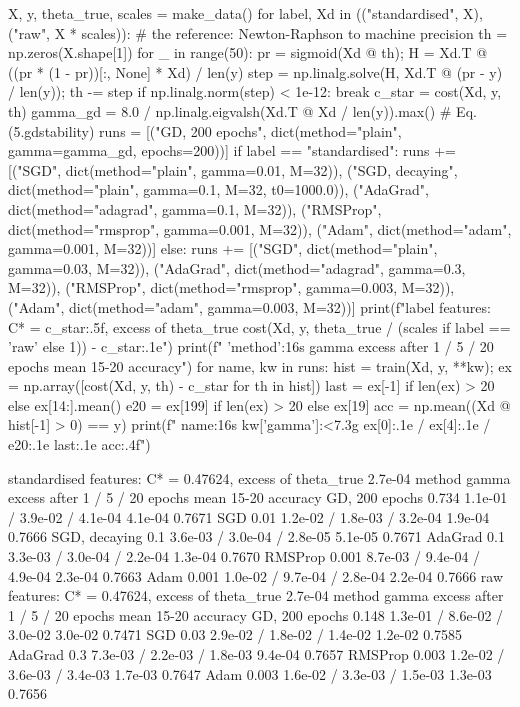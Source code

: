 \begin{Python}{}
X, y, theta_true, scales = make_data()
for label, Xd in (("standardised", X), ("raw", X * scales)):
    # the reference: Newton-Raphson to machine precision
    th = np.zeros(X.shape[1])
    for _ in range(50):
        pr = sigmoid(Xd @ th); H = Xd.T @ ((pr * (1 - pr))[:, None] * Xd) / len(y)
        step = np.linalg.solve(H, Xd.T @ (pr - y) / len(y)); th -= step
        if np.linalg.norm(step) < 1e-12: break
    c_star = cost(Xd, y, th)
    gamma_gd = 8.0 / np.linalg.eigvalsh(Xd.T @ Xd / len(y)).max()      # Eq. (5.gdstability)
    runs = [("GD, 200 epochs", dict(method="plain", gamma=gamma_gd, epochs=200))]
    if label == "standardised":
        runs += [("SGD", dict(method="plain", gamma=0.01, M=32)),
                 ("SGD, decaying", dict(method="plain", gamma=0.1, M=32, t0=1000.0)),
                 ("AdaGrad", dict(method="adagrad", gamma=0.1, M=32)),
                 ("RMSProp", dict(method="rmsprop", gamma=0.001, M=32)),
                 ("Adam", dict(method="adam", gamma=0.001, M=32))]
    else:
        runs += [("SGD", dict(method="plain", gamma=0.03, M=32)),
                 ("AdaGrad", dict(method="adagrad", gamma=0.3, M=32)),
                 ("RMSProp", dict(method="rmsprop", gamma=0.003, M=32)),
                 ("Adam", dict(method="adam", gamma=0.003, M=32))]
    print(f"{label} features: C* = {c_star:.5f}, excess of theta_true {cost(Xd, y, theta_true / (scales if label == 'raw' else 1)) - c_star:.1e}")
    print(f"  {'method':16s} gamma    excess after 1 / 5 / 20 epochs   mean 15-20   accuracy")
    for name, kw in runs:
        hist = train(Xd, y, **kw); ex = np.array([cost(Xd, y, th) - c_star for th in hist])
        last = ex[-1] if len(ex) > 20 else ex[14:].mean()
        e20 = ex[199] if len(ex) > 20 else ex[19]
        acc = np.mean((Xd @ hist[-1] > 0) == y)
        print(f"  {name:16s} {kw['gamma']:<7.3g}  {ex[0]:.1e} / {ex[4]:.1e} / {e20:.1e}      {last:.1e}     {acc:.4f}")
\end{Python}

\begin{Python}{}
standardised features: C* = 0.47624, excess of theta_true 2.7e-04
  method           gamma    excess after 1 / 5 / 20 epochs   mean 15-20   accuracy
  GD, 200 epochs   0.734    1.1e-01 / 3.9e-02 / 4.1e-04      4.1e-04     0.7671
  SGD              0.01     1.2e-02 / 1.8e-03 / 3.2e-04      1.9e-04     0.7666
  SGD, decaying    0.1      3.6e-03 / 3.0e-04 / 2.8e-05      5.1e-05     0.7671
  AdaGrad          0.1      3.3e-03 / 3.0e-04 / 2.2e-04      1.3e-04     0.7670
  RMSProp          0.001    8.7e-03 / 9.4e-04 / 4.9e-04      2.3e-04     0.7663
  Adam             0.001    1.0e-02 / 9.7e-04 / 2.8e-04      2.2e-04     0.7666
raw features: C* = 0.47624, excess of theta_true 2.7e-04
  method           gamma    excess after 1 / 5 / 20 epochs   mean 15-20   accuracy
  GD, 200 epochs   0.148    1.3e-01 / 8.6e-02 / 3.0e-02      3.0e-02     0.7471
  SGD              0.03     2.9e-02 / 1.8e-02 / 1.4e-02      1.2e-02     0.7585
  AdaGrad          0.3      7.3e-03 / 2.2e-03 / 1.8e-03      9.4e-04     0.7657
  RMSProp          0.003    1.2e-02 / 3.6e-03 / 3.4e-03      1.7e-03     0.7647
  Adam             0.003    1.6e-02 / 3.3e-03 / 1.5e-03      1.3e-03     0.7656
\end{Python}

